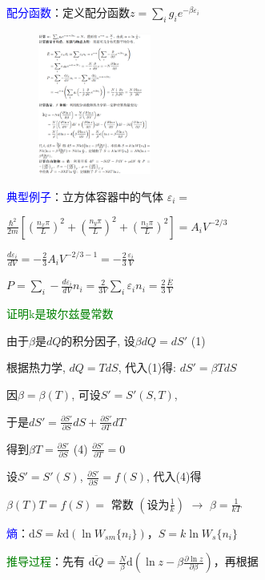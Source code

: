 \documentclass[a4paper,8pt]{extarticle} %
\newcommand{\bluetext}[1]{\textcolor{blue}{#1}}
\newcommand{\greentext}[1]{\textcolor{green}{#1}}
\begin{document}
\begin{multicols}{3}
\bluetext{配分函数}：定义配分函数$z=\sum_i g_i e^{-\beta\varepsilon_i}$

\begin{figure}[H]
    \vspace{-0.3cm}
    \centering
    \includegraphics[width=0.33\textwidth]{images/2.png}
    \vspace{-0.6cm}
\end{figure}

\bluetext{典型例子}：立方体容器中的气体
$\varepsilon_i = $

$\frac{\hbar^2}{2m}\left[\left(\frac{n_x\pi}{L}\right)^2 + \left(\frac{n_y\pi}{L}\right)^2 + \left(\frac{n_z\pi}{L}\right)^2\right] = A_iV^{-2/3}$

$\frac{d\varepsilon_i}{dV} = -\frac{2}{3}A_iV^{-2/3-1} = -\frac{2}{3}\frac{\varepsilon_i}{V}$

$P = \sum_i -\frac{d\varepsilon_i}{dV}n_i = \frac{2}{3V}\sum_i\varepsilon_in_i = \frac{2}{3}\frac{\bar{E}}{V}$

\greentext{证明k是玻尔兹曼常数}

由于$\beta$是$dQ$的积分因子, 设$\beta dQ = dS'$ (1)

根据热力学, $dQ = TdS$, 代入(1)得:
$dS' = \beta TdS$

因$\beta = \beta(T)$, 可设$S' = S'(S,T)$,

于是$dS' = \frac{\partial S'}{\partial S}dS + \frac{\partial S'}{\partial T}dT$

得到$\beta T = \frac{\partial S'}{\partial S}$ (4)
$\frac{\partial S'}{\partial T} = 0$

设$S' = S'(S)$, $\frac{\partial S'}{\partial S} = f(S)$, 代入(4)得

$\beta(T)T = f(S) =$ 常数 $(设为\frac{1}{k})$ $\rightarrow$ $\beta = \frac{1}{kT}$

\bluetext{熵}：$\mathrm{d}S = k\mathrm{d}(\ln W_{sm}\{n_i\})$，$S = k\ln W_s\{n_i\}$

\greentext{推导过程}：先有 $\overline{\mathrm{d}Q} = \frac{N}{\beta}\mathrm{d}(\ln z - \beta\frac{\partial\ln z}{\partial\beta})$，再根据 


\end{multicols}
\end{document}
